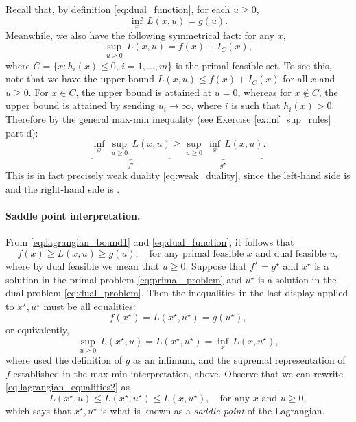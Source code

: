 Recall that, by definition \eqref{eq:dual_function}, for each $u \geq 0$,    
\[
\inf_x \, L(x,u) = g(u).
\]
Meanwhile, we also have the following symmetrical fact: for any $x$, 
\[
\sup_{u \geq 0} \, L(x,u) = f(x) + I_C(x),
\]
where $C = \{x : h_i(x) \leq 0, \, i=1,\dots,m\}$ is the primal feasible
set. To see this, note that we have the upper bound $L(x,u) \leq f(x) +
I_C(x)$ for all $x$ and $u \geq 0$. For $x \in C$, the upper bound is attained   
at $u = 0$, whereas for $x \notin C$, the upper bound is attained by sending 
$u_i \to \infty$, where $i$ is such that $h_i(x) > 0$. Therefore by the general
max-min inequality (see Exercise \ref{ex:inf_sup_rules} part d): 
\[
\underbrace{\inf_x \, \sup_{u \geq 0} \, L(x,u)}_{f^\star} \geq 
\underbrace{\sup_{u \geq 0} \, \inf_x \, L(x,u)}_{g^\star}.
\]
This is in fact precisely weak duality \eqref{eq:weak_duality}, since the 
left-hand side is  and the 
right-hand side is . 

\paragraph{Saddle point interpretation.}

From \eqref{eq:lagrangian_bound1} and \eqref{eq:dual_function}, it follows that  
\[
f(x) \geq L(x,u) \geq g(u), \quad \text{for any primal feasible $x$ and dual
  feasible $u$}, 
\]
where by dual feasible we mean that $u \geq 0$. Suppose that $f^\star =
g^\star$ and $x^\star$ is a solution in the primal problem
\eqref{eq:primal_problem} and $u^\star$ is a solution in the dual problem
\eqref{eq:dual_problem}. Then the inequalities in the last display applied to
$x^\star,u^\star$ must be all equalities:  
\begin{equation}
\label{eq:lagrangian_equalities1}
f(x^\star) = L(x^\star, u^\star) = g(u^\star),
\end{equation}
or equivalently, 
\begin{equation}
\label{eq:lagrangian_equalities2}
\sup_{u \geq 0} \, L(x^\star, u) = L(x^\star, u^\star) = \inf_x \, L(x,
u^\star), 
\end{equation}
where used the definition of $g$ as an infimum, and the supremal representation
of $f$ established in the max-min interpretation, above. Observe that we can
rewrite \eqref{eq:lagrangian_equalities2} as
\begin{equation}
\label{eq:lagrangian_saddle_point}
L(x^\star, u) \leq L(x^\star, u^\star) \leq L(x, u^\star), \quad \text{for any
  $x$ and $u \geq 0$},
\end{equation}
which says that $x^\star,u^\star$ is what is known as a \emph{saddle point} of 
the Lagrangian. 

